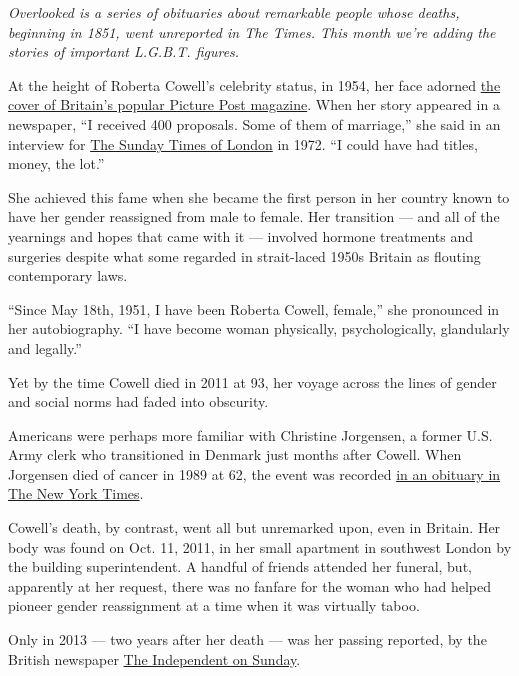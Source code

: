 \emph{Overlooked is a series of obituaries about remarkable people whose
deaths, beginning in 1851, went unreported in The Times. This month
we're adding the stories of important L.G.B.T. figures.}

At the height of Roberta Cowell's celebrity status, in 1954, her face
adorned \href{https://www.listal.com/roberta-cowell}{the cover of
Britain's popular Picture Post magazine}. When her story appeared in a
newspaper, ``I received 400 proposals. Some of them of marriage,'' she
said in an interview for
\href{http://www.lizhodgkinson.com/lh/journalismArticle/interview_with_transsexual_roberta_betty_cowell}{The
Sunday Times of London} in 1972. ``I could have had titles, money, the
lot.''

She achieved this fame when she became the first person in her country
known to have her gender reassigned from male to female. Her transition
--- and all of the yearnings and hopes that came with it --- involved
hormone treatments and surgeries despite what some regarded in
strait-laced 1950s Britain as flouting contemporary laws.

``Since May 18th, 1951, I have been Roberta Cowell, female,'' she
pronounced in her autobiography. ``I have become woman physically,
psychologically, glandularly and legally.''

Yet by the time Cowell died in 2011 at 93, her voyage across the lines
of gender and social norms had faded into obscurity.

Americans were perhaps more familiar with Christine Jorgensen, a former
U.S. Army clerk who transitioned in Denmark just months after Cowell.
When Jorgensen died of cancer in 1989 at 62, the event was recorded
\href{https://www.nytimes.com/1989/05/04/obituaries/christine-jorgensen-62-is-dead-was-first-to-have-a-sex-change.html}{in
an obituary in The New York Times}.

Cowell's death, by contrast, went all but unremarked upon, even in
Britain. Her body was found on Oct. 11, 2011, in her small apartment in
southwest London by the building superintendent. A handful of friends
attended her funeral, but, apparently at her request, there was no
fanfare for the woman who had helped pioneer gender reassignment at a
time when it was virtually taboo.

Only in 2013 --- two years after her death --- was her passing reported,
by the British newspaper
\href{https://www.independent.co.uk/news/people/profiles/its-easier-to-change-a-body-than-to-change-a-mind-the-extraordinary-life-and-lonely-death-of-roberta-8899823.html}{The
Independent on Sunday}.

